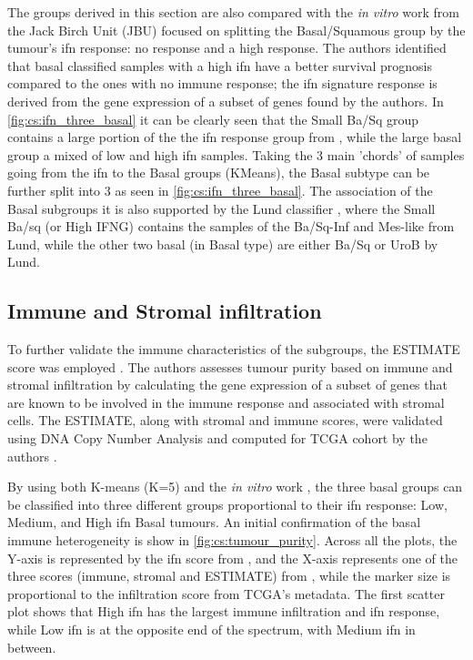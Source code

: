 The groups derived in this section are also compared with the \textit{in vitro} work \citet{Baker2022-bj} from the Jack Birch Unit (JBU) focused on splitting the Basal/Squamous group by the tumour's \acrfull{ifn} response: no response and a high response. The authors identified that basal classified samples with a high \acrshort{ifn} have a better survival prognosis compared to the ones with no immune response; the \acrshort{ifn} signature response is derived from the gene expression of a subset of genes found by the authors. In \cref{fig:cs:ifn_three_basal} it can be clearly seen that the Small Ba/Sq group contains a large portion of the the \acrshort{ifn} response group from \citet{Baker2022-bj}, while the large basal group a mixed of low and high \acrshort{ifn} samples. Taking the 3 main 'chords' of samples going from the \acrshort{ifn} to the Basal groups (KMeans), the Basal subtype can be further split into 3 as seen in \cref{fig:cs:ifn_three_basal}. The association of the Basal subgroups it is also supported by the Lund classifier \citep{Marzouka2018-ge}, where the Small Ba/sq (or High IFNG) contains the samples of the Ba/Sq-Inf and Mes-like from Lund, while the other two basal (in Basal type) are either Ba/Sq or UroB by Lund.

\subsection{Immune and Stromal infiltration}

To further validate the immune characteristics of the subgroups, the ESTIMATE score was employed \citep{Yoshihara2013-wq}. The authors assesses tumour purity based on immune and stromal infiltration by calculating the gene expression of a subset of genes that are known to be involved in the immune response and associated with stromal cells. The ESTIMATE, along with stromal and immune scores, were validated using DNA Copy Number Analysis and computed for TCGA cohort by the authors \citep{Yoshihara2013-wq}.

By using both K-means (K=5) and the \textit{in vitro} work \citep{Baker2022-bj}, the three basal groups can be classified into three different groups proportional to their \acrfull{ifn} response: Low, Medium, and High \acrshort{ifn} Basal tumours. An initial confirmation of the basal immune heterogeneity is show in \cref{fig:cs:tumour_purity}. Across all the plots, the Y-axis is represented by the \acrshort{ifn} score from \citet{Baker2022-bj}, and the X-axis represents one of the three scores (immune, stromal and ESTIMATE) from \citet{Yoshihara2013-wq}, while the marker size is proportional to the infiltration score from TCGA's metadata. The first scatter plot shows that High \acrshort{ifn} has the largest immune infiltration and \acrshort{ifn} response, while Low \acrshort{ifn} is at the opposite end of the spectrum, with Medium \acrshort{ifn} in between.

